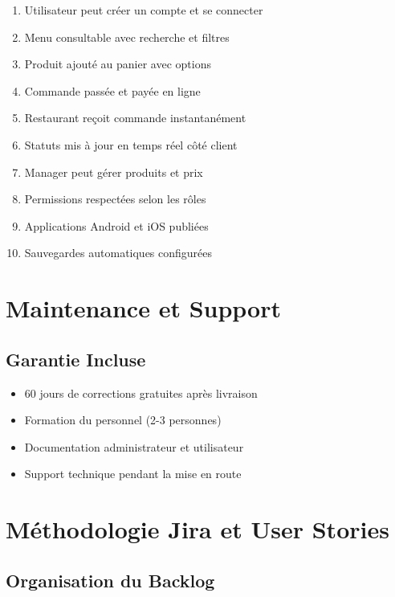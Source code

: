 \documentclass[11pt,a4paper]{article}
\begin{document}
\begin{enumerate}
    \item Utilisateur peut créer un compte et se connecter
    \item Menu consultable avec recherche et filtres
    \item Produit ajouté au panier avec options
    \item Commande passée et payée en ligne
    \item Restaurant reçoit commande instantanément
    \item Statuts mis à jour en temps réel côté client
    \item Manager peut gérer produits et prix
    \item Permissions respectées selon les rôles
    \item Applications Android et iOS publiées
    \item Sauvegardes automatiques configurées
\end{enumerate}

\section{Maintenance et Support}

\subsection{Garantie Incluse}

\begin{itemize}
    \item 60 jours de corrections gratuites après livraison
    \item Formation du personnel (2-3 personnes)
    \item Documentation administrateur et utilisateur
    \item Support technique pendant la mise en route
\end{itemize}

\section{Méthodologie Jira et User Stories}

\subsection{Organisation du Backlog}
\end{document}
